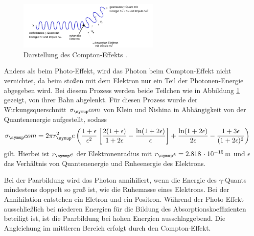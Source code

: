 \begin{figure}
  \includegraphics[width=7cm]{bilder/compton.jpg}
  \caption{Darstellung des Compton-Effekts \cite{704}.}
  \label{fig:com}
\end{figure}
Anders als beim Photo-Effekt, wird das Photon beim Compton-Effekt nicht vernichtet,
da beim stoßen mit dem Elektron nur ein Teil der Photonen-Energie abgegeben wird.
Bei diesem Prozess werden beide Teilchen wie in Abbildung \ref{fig:com} gezeigt,
von ihrer Bahn abgelenkt.
Für diesen Prozess wurde der Wirkungsquerschnitt $\sigma_\su{com}$ von Klein und
Nishina in Abhängigkeit von der Quantenenergie aufgestellt, sodass
\begin{equation}
  \sigma_\su{com}= 2\pi r^2_\su{e}\lf(\frac{1+\epsilon}{\epsilon^2}\lf[\frac{2(1+
  \epsilon)}{1+2\epsilon}-\frac{\ln(1+2\epsilon)}{\epsilon}\rt]+\frac{\ln(1+2\epsilon)}
  {2\epsilon}-\frac{1+3\epsilon}{(1+2\epsilon)^2}\rt)
\end{equation}
gilt. Hierbei ist $r_\su{e}$ der Elektronenradius mit $r_\su{e}=2.818\,\cdot10^
{-15}\mt$ \cite{rad} und $\epsilon$ das Verhältnis von Quantenenergie und Ruheenergie
des Elektrons.

Bei der Paarbildung wird das Photon annihiliert, wenn die Energie des $\gamma$-Quants
mindestens doppelt so groß ist, wie die Ruhemasse eines Elektrons. Bei der
Annihilation entstehen ein Eletron und ein Positron.
Während der Photo-Effekt ausschließlich bei niederen Energien für die Bildung des
Absorptionskoeffizienten beteiligt ist, ist die Paarbildung bei hohen Energien
ausschlaggebend. Die Angleichung im mittleren Bereich erfolgt durch den
Compton-Effekt.
